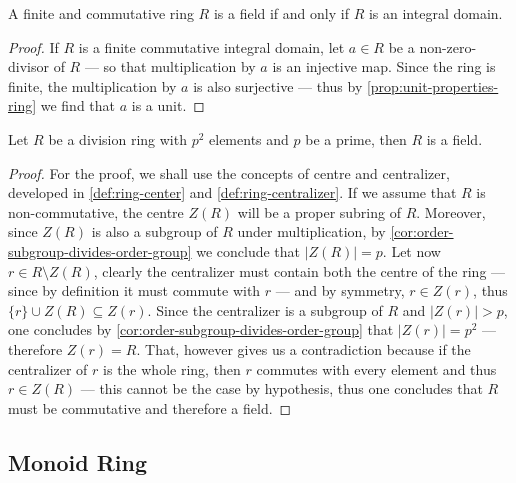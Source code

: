 %
\begin{proposition}
\label{prop:commutative-field-iff-integral-domain}
A finite and commutative ring \(R\) is a field if and only if \(R\) is an
integral domain.
\end{proposition}
%

%
\begin{proof}
If \(R\) is a finite commutative integral domain, let \(a \in R\) be a
non-zero-divisor of \(R\) --- so that multiplication by \(a\) is an injective
map. Since the ring is finite, the multiplication by \(a\) is also surjective
--- thus by \cref{prop:unit-properties-ring} we find that \(a\) is a unit.
\end{proof}
%

%
\begin{proposition}
\label{prop:division-ring-p2-elements-commutative}
Let \(R\) be a division ring with \(p^2\) elements and \(p\) be a prime,
then \(R\) is a field.
\end{proposition}
%

%
\begin{proof}
For the proof, we shall use the concepts of centre and centralizer, developed in
\cref{def:ring-center} and \cref{def:ring-centralizer}. If we assume that \(R\)
is non-commutative, the centre \(Z(R)\) will be a proper subring of
\(R\). Moreover, since \(Z(R)\) is also a subgroup of \(R\) under
multiplication, by \cref{cor:order-subgroup-divides-order-group} we conclude
that \(|Z(R)| = p\). Let now \(r \in R \setminus Z(R)\), clearly the centralizer
must contain both the centre of the ring --- since by definition it must commute
with \(r\) --- and by symmetry, \(r \in Z(r)\), thus
\(\{r\} \cup Z(R) \subseteq Z(r)\). Since the centralizer is a subgroup of \(R\)
and \(|Z(r)| > p\), one concludes by
\cref{cor:order-subgroup-divides-order-group} that \(|Z(r)| = p^2\) ---
therefore \(Z(r) = R\). That, however gives us a contradiction because if the
centralizer of \(r\) is the whole ring, then \(r\) commutes with every element
and thus \(r \in Z(R)\) --- this cannot be the case by hypothesis, thus one
concludes that \(R\) must be commutative and therefore a field.
\end{proof}
%

\subsection{Monoid Ring}

